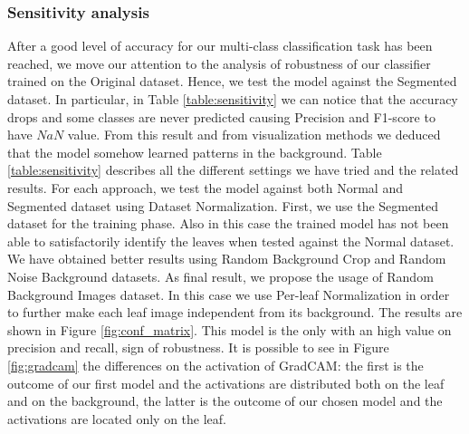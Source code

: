 \subsubsection{Sensitivity analysis}
After a good level of accuracy for our multi-class classification task has been reached, we move our attention to the analysis of robustness of our classifier trained on the Original dataset. Hence, we test the model against the Segmented dataset. In particular, in Table \ref{table:sensitivity} we can notice that the accuracy drops and some classes are never predicted causing Precision and F1-score to have $NaN$ value. From this result and from visualization methods we deduced that the model somehow learned patterns in the background. Table \ref{table:sensitivity} describes all the different settings we have tried and the related results. For each approach, we test the model against both Normal and Segmented dataset using Dataset Normalization. First, we use the Segmented dataset for the training phase. Also in this case the trained model has not been able to satisfactorily identify the leaves when tested against the Normal dataset. We have obtained better results using Random Background Crop and Random Noise Background datasets. As final result, we propose the usage of Random Background Images dataset. In this case we use Per-leaf Normalization in order to further make each leaf image independent from its background. The results are shown in Figure \ref{fig:conf_matrix}. This model is the only with an high value on precision and recall, sign of robustness. It is possible to see in Figure \ref{fig:gradcam} the differences on the activation of GradCAM: the first is the outcome of our first model and the activations are distributed both on the leaf and on the background, the latter is the outcome of our chosen model and the activations are located only on the leaf.
